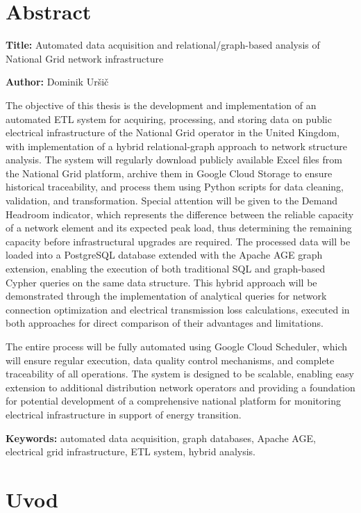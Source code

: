 \documentclass[a4paper,12pt,openright]{book}
\newcommand{\ttitleEn}{Automated data acquisition and relational/graph-based analysis of National Grid network infrastructure}
\newcommand{\tauthor}{Dominik Uršič}
\newcommand{\tkeywordsEn}{automated data acquisition, graph databases, Apache AGE, electrical grid infrastructure, ETL system, hybrid analysis}
\newcommand{\clearemptydoublepage}{\newpage{\pagestyle{empty}\cleardoublepage}}
\begin{document}
\chapter*{Abstract}

\noindent\textbf{Title:} \ttitleEn
\bigskip

\noindent\textbf{Author:} \tauthor
\bigskip

\noindent The objective of this thesis is the development and implementation of an automated ETL system for acquiring, processing, and storing data on public electrical infrastructure of the National Grid operator in the United Kingdom, with implementation of a hybrid relational-graph approach to network structure analysis. The system will regularly download publicly available Excel files from the National Grid platform, archive them in Google Cloud Storage to ensure historical traceability, and process them using Python scripts for data cleaning, validation, and transformation. Special attention will be given to the Demand Headroom indicator, which represents the difference between the reliable capacity of a network element and its expected peak load, thus determining the remaining capacity before infrastructural upgrades are required. The processed data will be loaded into a PostgreSQL database extended with the Apache AGE graph extension, enabling the execution of both traditional SQL and graph-based Cypher queries on the same data structure. This hybrid approach will be demonstrated through the implementation of analytical queries for network connection optimization and electrical transmission loss calculations, executed in both approaches for direct comparison of their advantages and limitations.

The entire process will be fully automated using Google Cloud Scheduler, which will ensure regular execution, data quality control mechanisms, and complete traceability of all operations. The system is designed to be scalable, enabling easy extension to additional distribution network operators and providing a foundation for potential development of a comprehensive national platform for monitoring electrical infrastructure in support of energy transition.
\bigskip

\noindent\textbf{Keywords:} \tkeywordsEn.
\clearemptydoublepage

\mainmatter
\setcounter{page}{1}
\pagestyle{fancy}

\chapter{Uvod}
\end{document}
